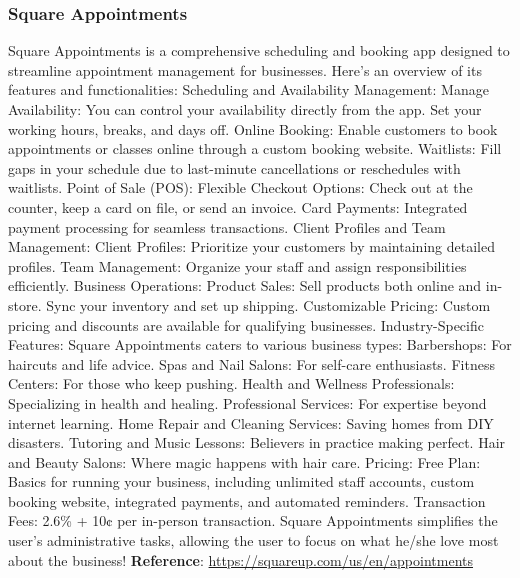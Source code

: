 \documentclass{article}
\begin{document}
      \subsubsection{Square Appointments}
      Square Appointments is a comprehensive scheduling and booking app designed to streamline appointment management for businesses. Here’s an overview of its features and functionalities:
      Scheduling and Availability Management:
      Manage Availability: You can control your availability directly from the app. Set your working hours, breaks, and days off.
      Online Booking: Enable customers to book appointments or classes online through a custom booking website.
      Waitlists: Fill gaps in your schedule due to last-minute cancellations or reschedules with waitlists.
      Point of Sale (POS):
      Flexible Checkout Options: Check out at the counter, keep a card on file, or send an invoice.
      Card Payments: Integrated payment processing for seamless transactions.
      Client Profiles and Team Management:
      Client Profiles: Prioritize your customers by maintaining detailed profiles.
      Team Management: Organize your staff and assign responsibilities efficiently.
      Business Operations:
      Product Sales: Sell products both online and in-store. Sync your inventory and set up shipping.
      Customizable Pricing: Custom pricing and discounts are available for qualifying businesses.
      Industry-Specific Features:
      Square Appointments caters to various business types:
      Barbershops: For haircuts and life advice.
      Spas and Nail Salons: For self-care enthusiasts.
      Fitness Centers: For those who keep pushing.
      Health and Wellness Professionals: Specializing in health and healing.
      Professional Services: For expertise beyond internet learning.
      Home Repair and Cleaning Services: Saving homes from DIY disasters.
      Tutoring and Music Lessons: Believers in practice making perfect.
      Hair and Beauty Salons: Where magic happens with hair care.
      Pricing:
      Free Plan: Basics for running your business, including unlimited staff accounts, custom booking website, integrated payments, and automated reminders.
      Transaction Fees: 2.6\% + 10¢ per in-person transaction.
      Square Appointments simplifies the user’s administrative tasks, allowing the user to focus on what he/she love most about the business!\newline
      \textbf{Reference}: \href{https://squareup.com/us/en/appointments}{https://squareup.com/us/en/appointments}
      
\end{document}
